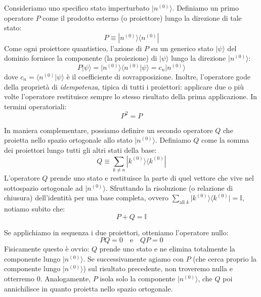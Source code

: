 Consideriamo uno specifico stato imperturbato $\vert{}n^{(0)}\rangle$. Definiamo un primo operatore $P$ come il prodotto esterno (o proiettore) lungo la direzione di tale stato:
\begin{equation}
P \equiv |n^{(0)}\rangle \langle n^{(0)}|
\end{equation}
Come ogni proiettore quantistico, l'azione di $P$ su un generico stato $\vert{}\psi\rangle$ del dominio fornisce la componente (la proiezione) di $\vert{}\psi\rangle$ lungo la direzione $\vert{}n^{(0)}\rangle$:
\begin{equation}
P|\psi\rangle = |n^{(0)}\rangle \langle n^{(0)} | \psi\rangle = c_n |n^{(0)}\rangle
\end{equation}
dove $c_n = \langle n^{(0)} \vert{} \psi\rangle$ è il coefficiente di sovrapposizione.
Inoltre, l'operatore gode della proprietà di \textit{idempotenza}, tipica di tutti i proiettori: applicare due o più volte l'operatore restituisce sempre lo stesso risultato della prima applicazione. In termini operatoriali:
\begin{equation}
P^2 = P
\end{equation}

In maniera complementare, possiamo definire un secondo operatore $Q$ che proietta nello spazio ortogonale allo stato $\vert{}n^{(0)}\rangle$. Definiamo $Q$ come la somma dei proiettori lungo tutti gli altri stati della base:
\begin{equation}
Q \equiv \sum_{k \neq n} |k^{(0)}\rangle \langle k^{(0)}|
\end{equation}
L'operatore $Q$ prende uno stato e restituisce la parte di quel vettore che vive nel sottospazio ortogonale ad $\vert{}n^{(0)}\rangle$.
Sfruttando la risoluzione (o relazione di chiusura) dell'identità per una base completa, ovvero $\sum_{\text{all } k} \vert{}k^{(0)}\rangle \langle k^{(0)}\vert{} = \mathbb{I}$, notiamo subito che:
\begin{equation}
P + Q = \mathbb{I}
\end{equation}

Se applichiamo in sequenza i due proiettori, otteniamo l'operatore nullo:
\begin{equation}
P Q = 0 \quad \text{e} \quad Q P = 0
\end{equation}
Fisicamente questo è ovvio: $Q$ prende uno stato e ne elimina totalmente la componente lungo $\vert{}n^{(0)}\rangle$. Se successivamente agiamo con $P$ (che cerca proprio la componente lungo $\vert{}n^{(0)}\rangle$) sul risultato precedente, non troveremo nulla e otterremo $0$. Analogamente, $P$ isola solo la componente $\vert{}n^{(0)}\rangle$, che $Q$ poi annichilisce in quanto proietta nello spazio ortogonale.

